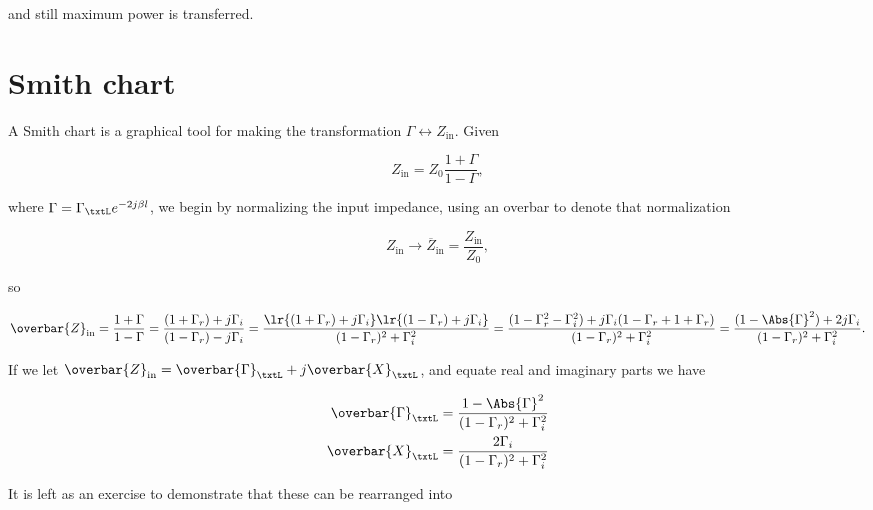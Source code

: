and still maximum power is transferred.

\section{Smith chart}

A Smith chart is a graphical tool for making the transformation \( \Gamma \leftrightarrow Z_{\textrm{in}} \).  Given

\begin{equation}\label{eqn:uwavesDeck5SmithChartCore:360}
Z_{\textrm{in}} = Z_0 \frac{ 1 + \Gamma }{ 1 - \Gamma },
\end{equation}

where \( \Gamma = \Gamma_\txtL e^{- 2 j \beta l } \), we begin by normalizing the input impedance, using an overbar to denote that normalization

\begin{equation}\label{eqn:uwavesDeck5SmithChartCore:380}
Z_{\textrm{in}} \rightarrow \overbar{Z}_{\textrm{in}} = \frac{Z_{\textrm{in}}}{Z_0},
\end{equation}

so

\begin{dmath}\label{eqn:uwavesDeck5SmithChartCore:400}
\overbar{Z}_{\textrm{in}}
= \frac{ 1 + \Gamma }{ 1 - \Gamma }
= \frac{ (1 + \Gamma_r) + j \Gamma_i }{ (1 - \Gamma_r) - j \Gamma_i }
= \frac{ \lr{ (1 + \Gamma_r) + j \Gamma_i}\lr{(1 - \Gamma_r) + j \Gamma_i} }{ (1 - \Gamma_r)^2 + \Gamma_i^2 }
= \frac{ (1 - \Gamma_r^2 - \Gamma_i^2) + j \Gamma_i (1 - \Gamma_r + 1 + \Gamma_r ) }{ (1 - \Gamma_r)^2 + \Gamma_i^2 }
= \frac{ (1 - \Abs{\Gamma}^2) + 2 j \Gamma_i }{ (1 - \Gamma_r)^2 + \Gamma_i^2 }.
\end{dmath}

If we let \( \overbar{Z}_{\textrm{in}} = \overbar{\Gamma}_\txtL + j \overbar{X}_\txtL \), and equate real and imaginary parts we have

\begin{equation}\label{eqn:uwavesDeck5SmithChartCore:420}
\begin{aligned}
\overbar{\Gamma}_\txtL &= \frac{ 1 - \Abs{\Gamma}^2 }{ (1 - \Gamma_r)^2 + \Gamma_i^2 } \\
\overbar{X}_\txtL &= \frac{2 \Gamma_i }{ (1 - \Gamma_r)^2 + \Gamma_i^2 }
\end{aligned}
\end{equation}

It is left as an exercise to demonstrate that these can be rearranged into

